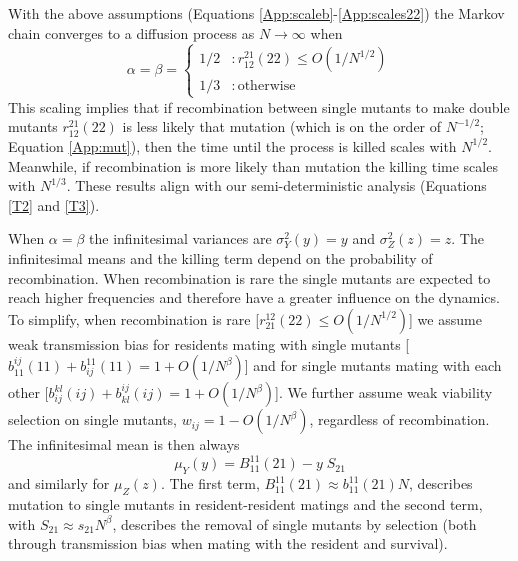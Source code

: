 \documentclass[review,3p,authoryear]{elsarticle}
\begin{document}
\begin{appendices}
With the above assumptions (Equations \ref{App:scaleb}-\ref{App:scales22}) the Markov chain converges to a diffusion process as $N\rightarrow\infty$ when
\begin{equation}\label{App:scaleAlphaBeta}
   \alpha = \beta = \left\{
     \begin{array}{ll}
       1/2 & : r_{12}^{21}(22) \leq O(1/N^{1/2})  \\
       1/3  &: \mathrm{otherwise}
      \end{array}
   \right.
\end{equation} 
This scaling implies that if recombination between single mutants to make double mutants $r_{12}^{21}(22)$ is less likely that mutation (which is on the order of $N^{-1/2}$; Equation \ref{App:mut}),  then the time until the process is killed scales with $N^{1/2}$.
Meanwhile, if recombination is more likely than mutation the killing time scales with $N^{1/3}$.
These results align with our semi-deterministic analysis (Equations \ref{T2} and \ref{T3}).

When $\alpha=\beta$ the infinitesimal variances are $\sigma_Y^2(y) = y$ and $\sigma_Z^2(z) = z$. 
The infinitesimal means and the killing term depend on the probability of recombination.
When recombination is rare the single mutants are expected to reach higher frequencies and therefore have a greater influence on the dynamics.
To simplify, when recombination is rare [$r_{21}^{12}(22) \leq O(1/N^{1/2})$] we assume weak transmission bias for residents mating with single mutants [$b_{11}^{ij}(11)+b_{ij}^{11}(11)=1+O(1/N^\beta)$] and for single mutants mating with each other [$b_{ij}^{kl}(ij)+b_{kl}^{ij}(ij)=1+O(1/N^\beta)$].
We further assume weak viability selection on single mutants, $w_{ij}=1-O(1/N^\beta)$, regardless of recombination.
The infinitesimal mean is then always
\begin{equation}\label{means}
   \mu_Y(y) = B_{11}^{11}(21) - y \; S_{21}
\end{equation} 
and similarly for $\mu_Z(z)$.
The first term, $B_{11}^{11}(21) \approx b_{11}^{11}(21) N$, describes mutation to single mutants in resident-resident matings and the second term, with $S_{21} \approx s_{21}N^\beta$, describes the removal of single mutants by selection (both through transmission bias when mating with the resident and survival). 


\end{appendices}
\end{document}
